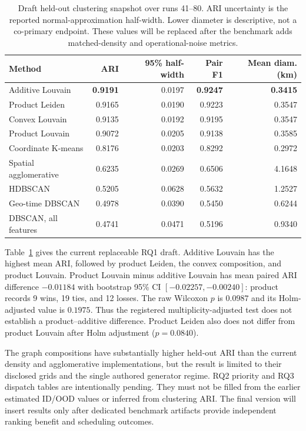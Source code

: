 \documentclass[runningheads]{llncs}
\begin{document}
\begin{table}[t]
\centering\small
\caption{Draft held-out clustering snapshot over runs 41--80. ARI uncertainty
is the reported normal-approximation half-width. Lower diameter is descriptive,
not a co-primary endpoint. These values will be replaced after the benchmark
adds matched-density and operational-noise metrics.}
\label{tab:short-clustering-results}
\begin{tabular}{lrrrr}
\toprule
Method & ARI & 95\% half-width & Pair F1 & Mean diam. (km)\\
\midrule
Additive Louvain & \textbf{0.9191} & 0.0197 & \textbf{0.9247} & \textbf{0.3415}\\
Product Leiden & 0.9165 & 0.0190 & 0.9223 & 0.3547\\
Convex Louvain & 0.9135 & 0.0192 & 0.9195 & 0.3547\\
Product Louvain & 0.9072 & 0.0205 & 0.9138 & 0.3585\\
Coordinate K-means & 0.8176 & 0.0203 & 0.8292 & 0.2972\\
Spatial agglomerative & 0.6235 & 0.0269 & 0.6506 & 4.1648\\
HDBSCAN & 0.5205 & 0.0628 & 0.5632 & 1.2527\\
Geo-time DBSCAN & 0.4978 & 0.0390 & 0.5450 & 0.6244\\
DBSCAN, all features & 0.4741 & 0.0471 & 0.5196 & 0.9340\\
\bottomrule
\end{tabular}
\end{table}

Table~\ref{tab:short-clustering-results} gives the current replaceable RQ1
draft. Additive Louvain has the highest mean ARI, followed by product Leiden,
the convex composition, and product Louvain. Product Louvain minus additive
Louvain has mean paired ARI difference $-0.01184$ with bootstrap 95\% CI
$[-0.02257,-0.00240]$: product records 9 wins, 19 ties, and 12 losses. The raw
Wilcoxon $p$ is $0.0987$ and its Holm-adjusted value is $0.1975$. Thus the
registered multiplicity-adjusted test does not establish a product--additive
difference. Product Leiden also does not differ from product Louvain after
Holm adjustment ($p=0.0840$).

The graph compositions have substantially higher held-out ARI than the
current density and agglomerative implementations, but the result is limited
to their disclosed grids and the single authored generator regime. RQ2
priority and RQ3 dispatch tables are intentionally pending. They must not be
filled from the earlier estimated ID/OOD values or inferred from clustering
ARI. The final version will insert results only after dedicated benchmark
artifacts provide independent ranking benefit and scheduling outcomes.
\end{document}

